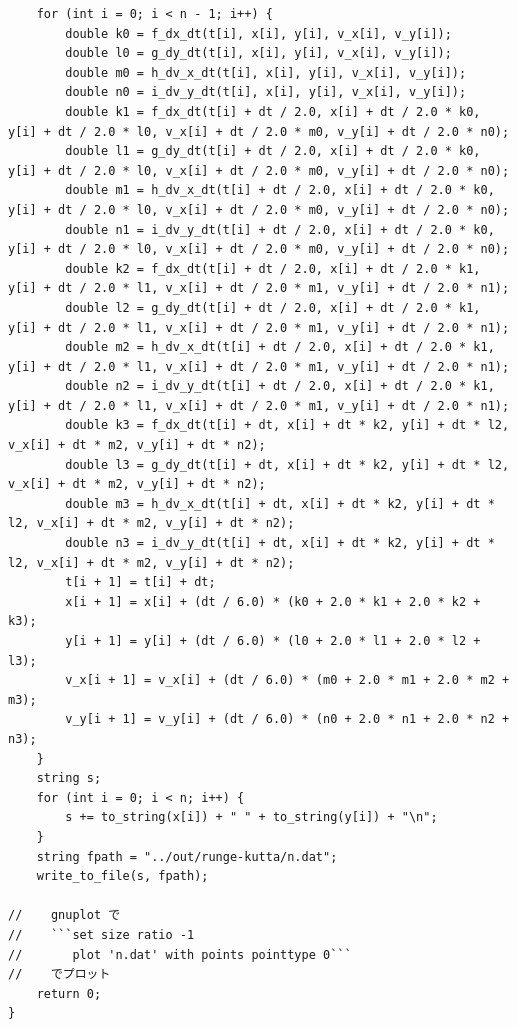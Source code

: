 \documentclass[a4paper,twoside]{jarticle}
\begin{document}
\begin{lstlisting}
    for (int i = 0; i < n - 1; i++) {
        double k0 = f_dx_dt(t[i], x[i], y[i], v_x[i], v_y[i]);
        double l0 = g_dy_dt(t[i], x[i], y[i], v_x[i], v_y[i]);
        double m0 = h_dv_x_dt(t[i], x[i], y[i], v_x[i], v_y[i]);
        double n0 = i_dv_y_dt(t[i], x[i], y[i], v_x[i], v_y[i]);
        double k1 = f_dx_dt(t[i] + dt / 2.0, x[i] + dt / 2.0 * k0, y[i] + dt / 2.0 * l0, v_x[i] + dt / 2.0 * m0, v_y[i] + dt / 2.0 * n0);
        double l1 = g_dy_dt(t[i] + dt / 2.0, x[i] + dt / 2.0 * k0, y[i] + dt / 2.0 * l0, v_x[i] + dt / 2.0 * m0, v_y[i] + dt / 2.0 * n0);
        double m1 = h_dv_x_dt(t[i] + dt / 2.0, x[i] + dt / 2.0 * k0, y[i] + dt / 2.0 * l0, v_x[i] + dt / 2.0 * m0, v_y[i] + dt / 2.0 * n0);
        double n1 = i_dv_y_dt(t[i] + dt / 2.0, x[i] + dt / 2.0 * k0, y[i] + dt / 2.0 * l0, v_x[i] + dt / 2.0 * m0, v_y[i] + dt / 2.0 * n0);
        double k2 = f_dx_dt(t[i] + dt / 2.0, x[i] + dt / 2.0 * k1, y[i] + dt / 2.0 * l1, v_x[i] + dt / 2.0 * m1, v_y[i] + dt / 2.0 * n1);
        double l2 = g_dy_dt(t[i] + dt / 2.0, x[i] + dt / 2.0 * k1, y[i] + dt / 2.0 * l1, v_x[i] + dt / 2.0 * m1, v_y[i] + dt / 2.0 * n1);
        double m2 = h_dv_x_dt(t[i] + dt / 2.0, x[i] + dt / 2.0 * k1, y[i] + dt / 2.0 * l1, v_x[i] + dt / 2.0 * m1, v_y[i] + dt / 2.0 * n1);
        double n2 = i_dv_y_dt(t[i] + dt / 2.0, x[i] + dt / 2.0 * k1, y[i] + dt / 2.0 * l1, v_x[i] + dt / 2.0 * m1, v_y[i] + dt / 2.0 * n1);
        double k3 = f_dx_dt(t[i] + dt, x[i] + dt * k2, y[i] + dt * l2, v_x[i] + dt * m2, v_y[i] + dt * n2);
        double l3 = g_dy_dt(t[i] + dt, x[i] + dt * k2, y[i] + dt * l2, v_x[i] + dt * m2, v_y[i] + dt * n2);
        double m3 = h_dv_x_dt(t[i] + dt, x[i] + dt * k2, y[i] + dt * l2, v_x[i] + dt * m2, v_y[i] + dt * n2);
        double n3 = i_dv_y_dt(t[i] + dt, x[i] + dt * k2, y[i] + dt * l2, v_x[i] + dt * m2, v_y[i] + dt * n2);
        t[i + 1] = t[i] + dt;
        x[i + 1] = x[i] + (dt / 6.0) * (k0 + 2.0 * k1 + 2.0 * k2 + k3);
        y[i + 1] = y[i] + (dt / 6.0) * (l0 + 2.0 * l1 + 2.0 * l2 + l3);
        v_x[i + 1] = v_x[i] + (dt / 6.0) * (m0 + 2.0 * m1 + 2.0 * m2 + m3);
        v_y[i + 1] = v_y[i] + (dt / 6.0) * (n0 + 2.0 * n1 + 2.0 * n2 + n3);
    }
    string s;
    for (int i = 0; i < n; i++) {
        s += to_string(x[i]) + " " + to_string(y[i]) + "\n";
    }
    string fpath = "../out/runge-kutta/n.dat";
    write_to_file(s, fpath);

//    gnuplot で
//    ```set size ratio -1
//       plot 'n.dat' with points pointtype 0```
//    でプロット
    return 0;
}

\end{lstlisting}
\end{document}
